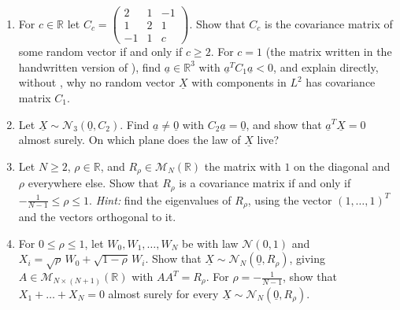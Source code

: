 
\begin{exercise}\label{ex:gv-covariance-matrices}
\easy
\begin{enumerate}[label=(\alph*)]
  \item For $c\in\mathbb R$ let
    $C_c=\begin{pmatrix}2&1&-1\\1&2&1\\-1&1&c\end{pmatrix}$. Show that $C_c$ is the covariance
    matrix of some random vector if and only if $c\ge2$. For $c=1$ (the matrix written in the
    handwritten version of ), find $\underline a\in\mathbb R^3$ with
    $\underline a^TC_1\underline a<0$, and explain directly, without
    , why no random vector $\underline X$ with components in $L^2$
    has covariance matrix $C_1$.
  \item Let $\underline X\sim\mathcal N_3(\underline 0,C_2)$. Find $\underline a\ne\underline 0$ with
    $C_2\underline a=\underline 0$, and show that $\underline a^T\underline X=0$ almost surely. On
    which plane does the law of $\underline X$ live?
  \item Let $N\ge2$, $\rho\in\mathbb R$, and $R_\rho\in\mathcal M_N(\mathbb R)$ the matrix with $1$
    on the diagonal and $\rho$ everywhere else. Show that $R_\rho$ is a covariance matrix if and only
    if $-\frac1{N-1}\le\rho\le1$. \emph{Hint:} find the eigenvalues of $R_\rho$, using the vector
    $(1,\dots,1)^T$ and the vectors orthogonal to it.
  \item For $0\le\rho\le1$, let $W_0,W_1,\dots,W_N$ be \iid with law $\mathcal N(0,1)$ and
    $X_i=\sqrt\rho\,W_0+\sqrt{1-\rho}\,W_i$. Show that $\underline X\sim\mathcal N_N(\underline 0,R_\rho)$,
    giving $A\in\mathcal M_{N\times(N+1)}(\mathbb R)$ with $AA^T=R_\rho$. For
    $\rho=-\frac1{N-1}$, show that $X_1+\dots+X_N=0$ almost surely for every
    $\underline X\sim\mathcal N_N(\underline 0,R_\rho)$.
\end{enumerate}
\end{exercise}

